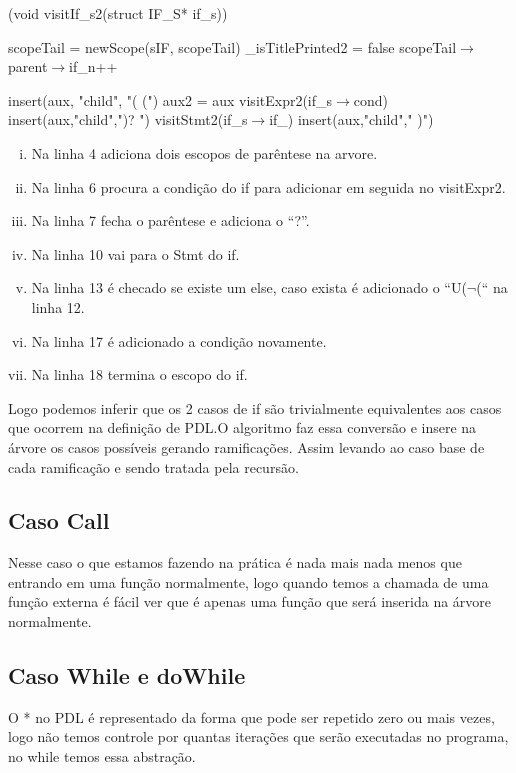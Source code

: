 \documentclass{article}
\begin{document}
	\begin{algorithm}[hbt]
		\caption{(void visitIf\_s2(struct IF\_S* if\_s))}
		scopeTail = newScope(sIF, scopeTail)\;
		\_isTitlePrinted2 = false\;
		scopeTail$\rightarrow$parent$\rightarrow$if\_n++\;
		
		insert(aux, "child", "( (")\;
		aux2 = aux\;
		visitExpr2(if\_s$\rightarrow$cond)\;
		insert(aux,"child",")? ")\;
		visitStmt2(if\_s$\rightarrow$if\_)\;
		insert(aux,"child"," )")\;
	\end{algorithm}
\begin{enumerate}[(i)]
\item	Na linha 4 adiciona dois escopos de parêntese na arvore.
\item	Na linha 6 procura a condição do if para adicionar em seguida no visitExpr2.
\item	Na linha 7 fecha o parêntese e adiciona o “?”.
\item	Na linha 10 vai para o Stmt do if.
\item	Na linha 13 é checado se existe um else, caso exista é adicionado o “U($\neg$(“ na linha 12.
\item	Na linha 17 é adicionado a condição novamente.
\item	Na linha 18 termina o escopo do if.
\end{enumerate}
	
	Logo podemos inferir que os 2 casos de if são trivialmente equivalentes aos casos que ocorrem na definição de PDL.O algoritmo faz essa conversão e insere na árvore os casos possíveis gerando ramificações. Assim levando ao caso base de cada ramificação e sendo tratada pela recursão.
	
	\subsection{Caso Call}
		Nesse caso o que estamos fazendo na prática é nada mais nada menos que entrando em uma função normalmente, logo quando temos a chamada de uma função externa é fácil ver que é apenas uma função que será inserida na árvore normalmente.
	
	\subsection{Caso While e doWhile}
		O * no PDL é representado da forma que pode ser repetido zero ou mais vezes, logo não temos controle por quantas iterações que serão executadas no programa, no while temos essa abstração.
		
\end{document}
